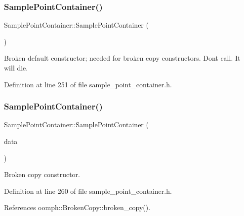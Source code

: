 \subsubsection{\texorpdfstring{Sample\+Point\+Container()}{SamplePointContainer()}\hspace{0.1cm}{\footnotesize\ttfamily [2/3]}}
{\footnotesize\ttfamily Sample\+Point\+Container\+::\+Sample\+Point\+Container (\begin{DoxyParamCaption}{ }\end{DoxyParamCaption})\hspace{0.3cm}{\ttfamily [inline]}}



Broken default constructor; needed for broken copy constructors. Don\textquotesingle{}t call. It will die. 



Definition at line 251 of file sample\+\_\+point\+\_\+container.\+h.

\mbox{\label{classSamplePointContainer_ad4dd29301d0ce831f3d702527de951a8}} 
\subsubsection{\texorpdfstring{Sample\+Point\+Container()}{SamplePointContainer()}\hspace{0.1cm}{\footnotesize\ttfamily [3/3]}}
{\footnotesize\ttfamily Sample\+Point\+Container\+::\+Sample\+Point\+Container (\begin{DoxyParamCaption}\item[{const \hyperlink{classSamplePointContainer}{Sample\+Point\+Container} \&}]{data }\end{DoxyParamCaption})\hspace{0.3cm}{\ttfamily [inline]}}



Broken copy constructor. 



Definition at line 260 of file sample\+\_\+point\+\_\+container.\+h.



References oomph\+::\+Broken\+Copy\+::broken\+\_\+copy().

\mbox{\label{classSamplePointContainer_a753a58798c528e01d384a4f444368db3}} 
